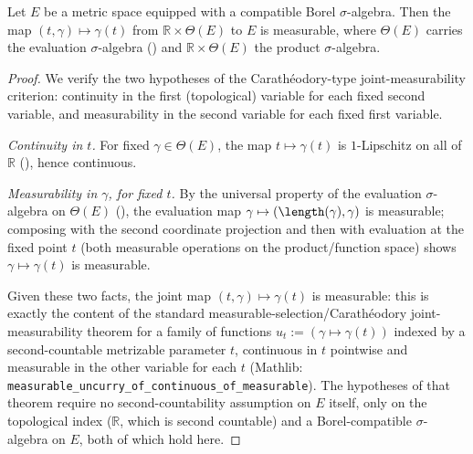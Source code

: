 \begin{helper}
  Let $E$ be a metric space equipped with a compatible Borel $\sigma$-algebra. Then the map
  $(t,\gamma) \mapsto \gamma(t)$ from $\mathbb{R} \times \Theta(E)$ to $E$ is measurable, where
  $\Theta(E)$ carries the evaluation $\sigma$-algebra () and
  $\mathbb{R} \times \Theta(E)$ the product $\sigma$-algebra.
\end{helper}
\begin{proof}
  We verify the two hypotheses of the Carath\'eodory-type joint-measurability criterion: continuity
  in the first (topological) variable for each fixed second variable, and measurability in the
  second variable for each fixed first variable.

  \emph{Continuity in $t$.} For fixed $\gamma \in \Theta(E)$, the map $t \mapsto \gamma(t)$ is
  $1$-Lipschitz on all of $\mathbb{R}$ (), hence continuous.

  \emph{Measurability in $\gamma$, for fixed $t$.} By the universal property of the evaluation
  $\sigma$-algebra on $\Theta(E)$ (), the evaluation map
  $\gamma \mapsto (\length(\gamma),\gamma)$ is measurable; composing with the second coordinate
  projection and then with evaluation at the fixed point $t$ (both measurable operations on the
  product/function space) shows $\gamma \mapsto \gamma(t)$ is measurable.

  Given these two facts, the joint map $(t,\gamma) \mapsto \gamma(t)$ is measurable: this is exactly
  the content of the standard measurable-selection/Carath\'eodory joint-measurability theorem for a
  family of functions $u_t := (\gamma \mapsto \gamma(t))$ indexed by a second-countable metrizable
  parameter $t$, continuous in $t$ pointwise and measurable in the other variable for each $t$
  (Mathlib: \texttt{measurable\_uncurry\_of\_continuous\_of\_measurable}). The hypotheses of that
  theorem require no second-countability assumption on $E$ itself, only on the topological index
  ($\mathbb{R}$, which is second countable) and a Borel-compatible $\sigma$-algebra on $E$, both of
  which hold here.
\end{proof}
